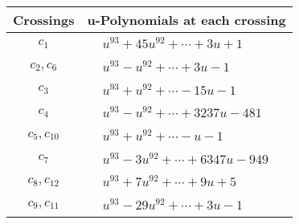\documentclass[1p]{elsarticle_modified}
\theoremstyle{definition}
\begin{document}
\begin{tabular}{m{50pt}|m{274pt}}
Crossings & \hspace{64pt}u-Polynomials at each crossing \\
\hline $$\begin{aligned}c_{1}\end{aligned}$$&$\begin{aligned}
&u^{93}+45 u^{92}+\cdots+3 u+1
\end{aligned}$\\
\hline $$\begin{aligned}c_{2},c_{6}\end{aligned}$$&$\begin{aligned}
&u^{93}- u^{92}+\cdots+3 u-1
\end{aligned}$\\
\hline $$\begin{aligned}c_{3}\end{aligned}$$&$\begin{aligned}
&u^{93}+u^{92}+\cdots-15 u-1
\end{aligned}$\\
\hline $$\begin{aligned}c_{4}\end{aligned}$$&$\begin{aligned}
&u^{93}- u^{92}+\cdots+3237 u-481
\end{aligned}$\\
\hline $$\begin{aligned}c_{5},c_{10}\end{aligned}$$&$\begin{aligned}
&u^{93}+u^{92}+\cdots- u-1
\end{aligned}$\\
\hline $$\begin{aligned}c_{7}\end{aligned}$$&$\begin{aligned}
&u^{93}-3 u^{92}+\cdots+6347 u-949
\end{aligned}$\\
\hline $$\begin{aligned}c_{8},c_{12}\end{aligned}$$&$\begin{aligned}
&u^{93}+7 u^{92}+\cdots+9 u+5
\end{aligned}$\\
\hline $$\begin{aligned}c_{9},c_{11}\end{aligned}$$&$\begin{aligned}
&u^{93}-29 u^{92}+\cdots+3 u-1
\end{aligned}$\\
\hline
\end{tabular}\newpage\renewcommand{\arraystretch}{1}
\end{document}
